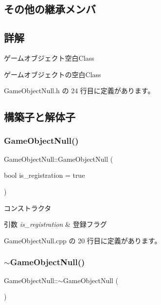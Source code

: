\subsection*{その他の継承メンバ}


\subsection{詳解}
ゲームオブジェクト空白\+Class 

ゲームオブジェクトの空白\+Class 

 Game\+Object\+Null.\+h の 24 行目に定義があります。



\subsection{構築子と解体子}
\mbox{\label{class_game_object_null_a63df1fd88b786686088b2ac9f79761d1}} 
\subsubsection{\texorpdfstring{Game\+Object\+Null()}{GameObjectNull()}}
{\footnotesize\ttfamily Game\+Object\+Null\+::\+Game\+Object\+Null (\begin{DoxyParamCaption}\item[{bool}]{is\+\_\+registration = {\ttfamily true} }\end{DoxyParamCaption})}



コンストラクタ 


\begin{DoxyParams}{引数}
{\em is\+\_\+registration} & 登録フラグ \\
\hline
\end{DoxyParams}


 Game\+Object\+Null.\+cpp の 20 行目に定義があります。

\mbox{\label{class_game_object_null_a3aee36c6a66b723f927c017ec3916918}} 
\subsubsection{\texorpdfstring{$\sim$\+Game\+Object\+Null()}{~GameObjectNull()}}
{\footnotesize\ttfamily Game\+Object\+Null\+::$\sim$\+Game\+Object\+Null (\begin{DoxyParamCaption}{ }\end{DoxyParamCaption})\hspace{0.3cm}{\ttfamily [virtual]}}



